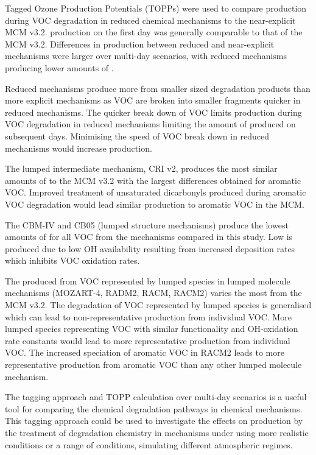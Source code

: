Tagged Ozone Production Potentials (TOPPs) were used to compare  production during VOC degradation in reduced chemical mechanisms to the near-explicit MCM v3.2. 
 production on the first day was generally comparable to that of the MCM v3.2.
Differences in  production between reduced and near-explicit mechanisms were larger over multi-day scenarios, with reduced mechanisms producing lower amounts of .

Reduced mechanisms produce more  from smaller sized degradation products than more explicit mechanisms as VOC are broken into smaller fragments quicker in reduced mechanisms.
The quicker break down of VOC limits  production during VOC degradation in reduced mechanisms limiting the amount of  produced on subsequent days.
Minimising the speed of VOC break down in reduced mechanisms would increase  production.

The lumped intermediate mechanism, CRI v2, produces the most similar amounts of  to the MCM v3.2 with the largest differences obtained for aromatic VOC.
Improved treatment of unsaturated dicarbonyls produced during aromatic VOC degradation would lead similar  production to aromatic VOC in the MCM.

The CBM-IV and CB05 (lumped structure mechanisms) produce the lowest amounts of  for all VOC from the mechanisms compared in this study.
Low  is produced due to low OH availability resulting from increased  deposition rates which inhibits VOC oxidation rates.

The  produced from VOC represented by lumped species in lumped molecule mechanisms (MOZART-4, RADM2, RACM, RACM2) varies the most from the MCM v3.2.
The degradation of VOC represented by lumped species is generalised which can lead to non-representative  production from individual VOC.
More lumped species representing VOC with similar functionality and OH-oxidation rate constants would lead to more representative  production from individual VOC.
The increased speciation of aromatic VOC in RACM2 leads to more representative  production from aromatic VOC than any other lumped molecule mechanism.

The tagging approach and TOPP calculation over multi-day scenarios is a useful tool for comparing the chemical degradation pathways in chemical mechanisms. 
This tagging approach could be used to investigate the effects on  production by the treatment of degradation chemistry in mechanisms under using more realistic  conditions or a range of  conditions, simulating different atmospheric regimes. 

